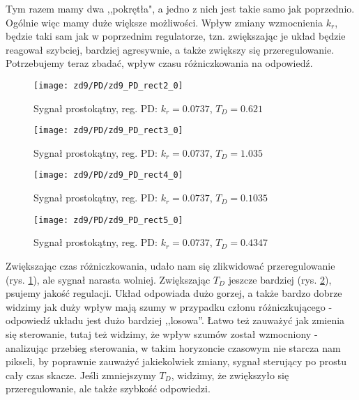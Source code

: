 \documentclass[11 pt]{article}
\begin{document}
Tym razem mamy dwa ,,pokrętła", a jedno z nich jest takie samo jak poprzednio. Ogólnie więc mamy duże większe możliwości. Wpływ zmiany wzmocnienia $k_r$, będzie taki sam jak w poprzednim regulatorze, tzn. zwiększając je układ będzie reagował szybciej, bardziej agresywnie, a także zwiększy się przeregulowanie. Potrzebujemy teraz zbadać, wpływ czasu różniczkowania na odpowiedź.

\begin{figure}[h!]
	\centerline{
	\texttt{[image: zd9/PD/zd9\_PD\_rect2\_0]}
	}
	\caption{Sygnał prostokątny, reg. PD: $k_r = 0.0737$, $T_D = 0.621$}
	\label{fig:pd2}
\end{figure}

\newpage

\begin{figure}[h!]
	\centerline{
	\texttt{[image: zd9/PD/zd9\_PD\_rect3\_0]}
	}
	\caption{Sygnał prostokątny, reg. PD: $k_r = 0.0737$, $T_D = 1.035$}
	\label{fig:pd3}
\end{figure}

\begin{figure}[h!]
	\centerline{
	\texttt{[image: zd9/PD/zd9\_PD\_rect4\_0]}
	}
	\caption{Sygnał prostokątny, reg. PD: $k_r = 0.0737$, $T_D = 0.1035$}
	\label{fig:pd4}
\end{figure}

\begin{figure}[h!]
	\centerline{
	\texttt{[image: zd9/PD/zd9\_PD\_rect5\_0]}
	}
	\caption{Sygnał prostokątny, reg. PD: $k_r = 0.0737$, $T_D = 0.4347$}
	\label{fig:pd5}
\end{figure}

\newpage

Zwiększając czas różniczkowania, udało nam się zlikwidować przeregulowanie (rys. \ref{fig:pd2}), ale sygnał narasta wolniej. Zwiększając $T_D$ jeszcze bardziej (rys. \ref{fig:pd3}), psujemy jakość regulacji. Układ odpowiada dużo gorzej, a także bardzo dobrze widzimy jak duży wpływ mają szumy w przypadku członu różniczkującego - odpowiedź układu jest dużo bardziej ,,losowa''. Łatwo też zauważyć jak zmienia się sterowanie, tutaj też widzimy, że wpływ szumów został wzmocniony - analizując przebieg sterowania, w takim horyzoncie czasowym nie starcza nam pikseli, by poprawnie zauważyć jakiekolwiek zmiany, sygnał sterujący po prostu cały czas skacze. Jeśli zmniejszymy $T_D$, widzimy, że zwiększyło się przeregulowanie, ale także szybkość odpowiedzi.
\end{document}
